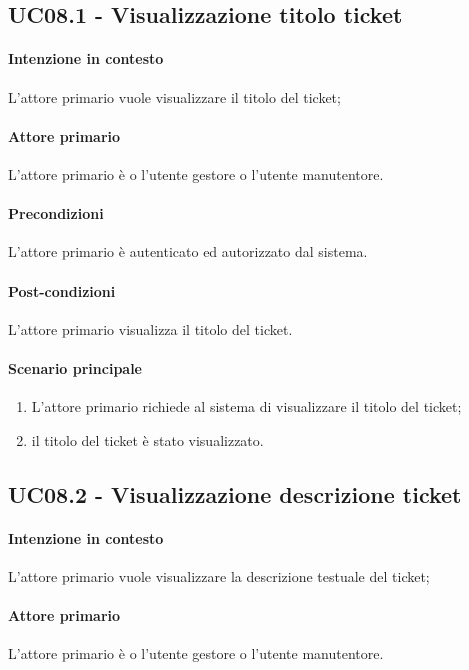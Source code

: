 \subsection{UC08.1 - Visualizzazione titolo ticket}\label{uc:08.1}

\paragraph{Intenzione in contesto} L'attore primario vuole visualizzare il titolo del ticket;
\paragraph{Attore primario} L'attore primario è o l'utente gestore o l'utente manutentore.
\paragraph{Precondizioni}  L'attore primario è autenticato ed autorizzato dal sistema.
\paragraph{Post-condizioni} L'attore primario visualizza il titolo del ticket.
\paragraph{Scenario principale}
\begin{enumerate}
    \item L'attore primario richiede al sistema di visualizzare il titolo del ticket;
    \item il titolo del ticket è stato visualizzato.
\end{enumerate}

\subsection{UC08.2 - Visualizzazione descrizione ticket}\label{uc:08.2}

\paragraph{Intenzione in contesto} L'attore primario vuole visualizzare la descrizione testuale del ticket;
\paragraph{Attore primario} L'attore primario è o l'utente gestore o l'utente manutentore.
